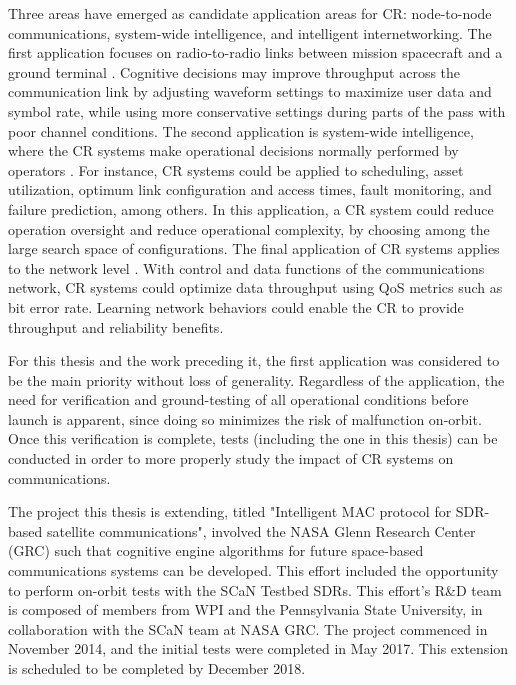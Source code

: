 	\par Three areas have emerged as candidate application areas for CR: node-to-node communications, system-wide intelligence, and intelligent internetworking. The first application focuses on radio-to-radio links between mission spacecraft and a ground terminal \cite{placeholderCitation}. Cognitive decisions may improve throughput across the communication link by adjusting waveform settings to maximize user data and symbol rate, while using more conservative settings during parts of the pass with poor channel conditions. The second application is system-wide intelligence, where the CR systems make operational decisions normally performed by operators \cite{placeholderCitation}. For instance, CR systems could be applied to scheduling, asset utilization, optimum link configuration and access times, fault monitoring, and failure prediction, among others. In this application, a CR system could reduce operation oversight and reduce operational complexity, by choosing among the large search space of configurations. The final application of CR systems applies to the network level \cite{placeholderCitation}. With control and data functions of the communications network, CR systems could optimize data throughput using QoS metrics such as bit error rate. Learning network behaviors could enable the CR to provide throughput and reliability benefits.
	\par  For this thesis and the work preceding it, the first application was considered to be the main priority without loss of generality. Regardless of the application, the need for verification and ground-testing of all operational conditions before launch is apparent, since doing so minimizes the risk of malfunction on-orbit. Once this verification is complete, tests (including the one in this thesis) can be conducted in order to more properly study the impact of CR systems on communications.
	\par The project this thesis is extending, titled "Intelligent MAC protocol for SDR-based satellite communications", involved the NASA Glenn Research Center (GRC) such that cognitive engine algorithms for future space-based communications systems can be developed. This effort included the opportunity to perform on-orbit tests with the SCaN Testbed SDRs. This effort's R\&D team is composed of members from WPI and the Pennsylvania State University, in collaboration with the SCaN team at NASA GRC. The project commenced in November 2014, and the initial tests were completed in May 2017. This extension is scheduled to be completed by December 2018.
